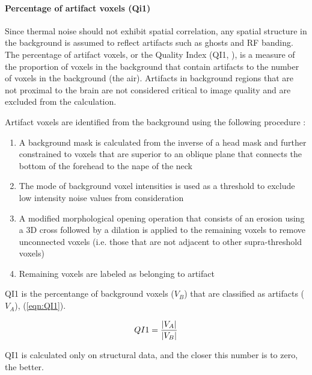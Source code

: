 \paragraph{Percentage of artifact voxels (Qi1)}
\label{sec:Qi1}

Since thermal noise should not exhibit spatial correlation, any spatial structure in the background is assumed to reflect artifacts such as ghosts and RF banding. The percentage of artifact voxels, or the Quality Index (QI1, \cite{mortamet2009}), is a measure of the proportion of voxels in the background that contain artifacts to the number of voxels in the background (the air). Artifacts in background regions that are not proximal to the brain are not considered critical to image quality and are excluded from the calculation.

Artifact voxels are identified from the background using the following procedure \cite{mortamet2009}:

\begin{enumerate}
    \item A background mask is calculated from the inverse of a head mask and further constrained to voxels that are superior to an oblique plane that connects the bottom of the forehead to the nape of the neck
    \item The mode of background voxel intensities is used as a threshold to exclude low intensity noise values from consideration
    \item A modified morphological opening operation that consists of an erosion using a 3D cross followed by a dilation is applied to the remaining voxels to remove unconnected voxels (i.e. those that are not adjacent to other supra-threshold voxels)
    \item Remaining voxels are labeled as belonging to artifact
\end{enumerate}

QI1 is the percentange of background voxels ($V_B$) that are classified as artifacts ($V_A$), (\ref{eqn:QI1}). 

\begin{equation}
\label{eqn:QI1}
QI1 = \frac{|V_A|}{|V_B|} \\
\end{equation}

QI1 is calculated only on structural data, and the closer this number is to zero, the better.

